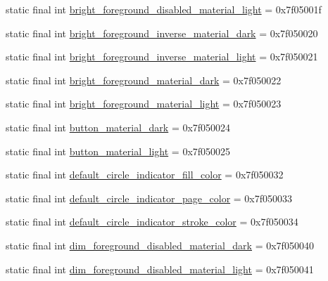 \begin{DoxyCompactItemize}
static final int \mbox{\hyperlink{classcom_1_1synnapps_1_1carouselview_1_1_r_1_1color_aefb520664bdd15a2a7bef89799e32c64}{bright\+\_\+foreground\+\_\+disabled\+\_\+material\+\_\+light}} = 0x7f05001f
\item 
static final int \mbox{\hyperlink{classcom_1_1synnapps_1_1carouselview_1_1_r_1_1color_a7d8a52ffb66606a6854373ad10569f5e}{bright\+\_\+foreground\+\_\+inverse\+\_\+material\+\_\+dark}} = 0x7f050020
\item 
static final int \mbox{\hyperlink{classcom_1_1synnapps_1_1carouselview_1_1_r_1_1color_a66434e6255a9ead79c205b898c24c6e3}{bright\+\_\+foreground\+\_\+inverse\+\_\+material\+\_\+light}} = 0x7f050021
\item 
static final int \mbox{\hyperlink{classcom_1_1synnapps_1_1carouselview_1_1_r_1_1color_a93c1c703fb7ddaf301d9c395551465a5}{bright\+\_\+foreground\+\_\+material\+\_\+dark}} = 0x7f050022
\item 
static final int \mbox{\hyperlink{classcom_1_1synnapps_1_1carouselview_1_1_r_1_1color_a894cccf4e9a7da8791cd9eb733454020}{bright\+\_\+foreground\+\_\+material\+\_\+light}} = 0x7f050023
\item 
static final int \mbox{\hyperlink{classcom_1_1synnapps_1_1carouselview_1_1_r_1_1color_abd7e0ce8076f3e16bdcb08ce3ea86c9e}{button\+\_\+material\+\_\+dark}} = 0x7f050024
\item 
static final int \mbox{\hyperlink{classcom_1_1synnapps_1_1carouselview_1_1_r_1_1color_ac73aa8380ad5ee07999627378d7680dd}{button\+\_\+material\+\_\+light}} = 0x7f050025
\item 
static final int \mbox{\hyperlink{classcom_1_1synnapps_1_1carouselview_1_1_r_1_1color_a62a2b1110eef315b9e8f5acfbc887406}{default\+\_\+circle\+\_\+indicator\+\_\+fill\+\_\+color}} = 0x7f050032
\item 
static final int \mbox{\hyperlink{classcom_1_1synnapps_1_1carouselview_1_1_r_1_1color_af105f10bebca3f98b990fc509dfa3280}{default\+\_\+circle\+\_\+indicator\+\_\+page\+\_\+color}} = 0x7f050033
\item 
static final int \mbox{\hyperlink{classcom_1_1synnapps_1_1carouselview_1_1_r_1_1color_a5a160390d587547f7b8f5adcb1a1a83b}{default\+\_\+circle\+\_\+indicator\+\_\+stroke\+\_\+color}} = 0x7f050034
\item 
static final int \mbox{\hyperlink{classcom_1_1synnapps_1_1carouselview_1_1_r_1_1color_a5eff5c55f275a1062c59cb0d5d99103c}{dim\+\_\+foreground\+\_\+disabled\+\_\+material\+\_\+dark}} = 0x7f050040
\item 
static final int \mbox{\hyperlink{classcom_1_1synnapps_1_1carouselview_1_1_r_1_1color_a97b88aeb700053548cfbde5f3a6b415a}{dim\+\_\+foreground\+\_\+disabled\+\_\+material\+\_\+light}} = 0x7f050041

\end{DoxyCompactItemize}

